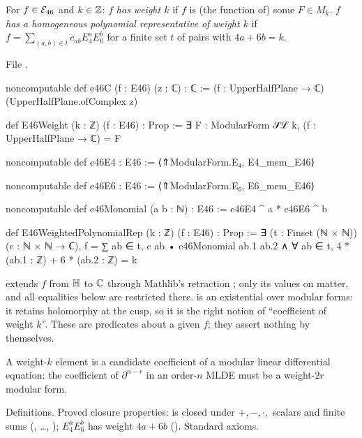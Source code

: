 \begin{definition}\label{l14:def:E46Weight}
For $f\in\mathcal{E}_{46}$ and $k\in{\mathbb{Z}}$: $f$ \emph{has weight $k$} if $f$ is (the function of) some $F\in M_k$. $f$ \emph{has a
homogeneous polynomial representative of weight $k$} if $f = \sum_{(a,b)\in t}c_{ab}E_4^aE_6^b$ for a finite set $t$ of
pairs with $4a+6b = k$.
\end{definition}
\noindent File .
\begin{leancode}
noncomputable def e46C (f : E46) (z : ℂ) : ℂ :=
  (f : UpperHalfPlane → ℂ) (UpperHalfPlane.ofComplex z)

def E46Weight (k : ℤ) (f : E46) : Prop :=
  ∃ F : ModularForm 𝒮ℒ k, (f : UpperHalfPlane → ℂ) = F

noncomputable def e46E4 : E46 := ⟨⇑ModularForm.E₄, E4_mem_E46⟩

noncomputable def e46E6 : E46 := ⟨⇑ModularForm.E₆, E6_mem_E46⟩

noncomputable def e46Monomial (a b : ℕ) : E46 := e46E4 ^ a * e46E6 ^ b

def E46WeightedPolynomialRep (k : ℤ) (f : E46) : Prop :=
  ∃ (t : Finset (ℕ × ℕ)) (c : ℕ × ℕ → ℂ),
    f = ∑ ab ∈ t, c ab • e46Monomial ab.1 ab.2 ∧
      ∀ ab ∈ t, 4 * (ab.1 : ℤ) + 6 * (ab.2 : ℤ) = k
\end{leancode}
\begin{dictionary}
 extends $f$ from $\mathbb{H}$ to ${\mathbb{C}}$ through Mathlib's retraction ; only its values on
 matter, and all equalities below are restricted there.  is an existential over modular forms:
it retains holomorphy at the cusp, so it is the right notion of ``coefficient of weight $k$''. These are predicates about a
given $f$; they assert nothing by themselves.
\end{dictionary}
\begin{physics}
A weight-$k$ element is a candidate coefficient of a modular linear differential equation: the coefficient of
$\partial^{n-r}$ in an order-$n$ MLDE must be a weight-$2r$ modular form.
\end{physics}
\begin{status}
Definitions. Proved closure properties:  is closed under $+,-,\cdot,$ scalars and finite sums
(, \dots, ); $E_4^aE_6^b$ has weight $4a+6b$ (). Standard axioms.
\end{status}

